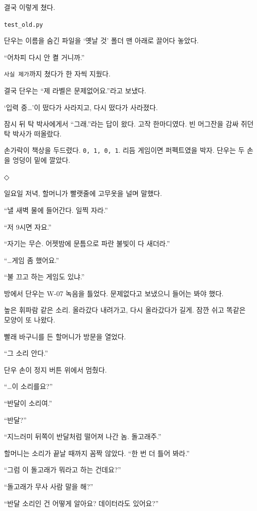 \documentclass[
  korean,
  letterpaper,
  twoside,
  open=any,
  fontsize=12.5pt,
  headings=small]{scrbook}
\begin{document}
결국 이렇게 쳤다.

\mbox{\texttt{test\_old.py}}

단우는 이름을 숨긴 파일을
`옛날 것' 폴더 맨 아래로
끌어다 놓았다.

``어차피 다시 안 켤 거니까.''

\texttt{사실\ 제가}까지 쳤다가
한 자씩 지웠다.

결국 단우는 ``제 라벨은
문제없어요.''라고 보냈다.

`입력 중\ldots'이 떴다가
사라지고, 다시 떴다가
사라졌다.

잠시 뒤 탁 박사에게서
``그래.''라는 답이 왔다. 고작
한마디였다. 빈 머그잔을 감싸
쥐던 탁 박사가 떠올랐다.

손가락이 책상을 두드렸다.
\mbox{\texttt{0, 1, 0, 1}}.
리듬 게임이면 퍼펙트였을 박자.
단우는 두 손을 엉덩이 밑에
깔았다.

\begin{center}◇\end{center}\nopagebreak

일요일 저녁, 할머니가 빨랫줄에
고무옷을 널며 말했다.

``낼 새벽 물에 들어간다. 일찍
자라.''

``저 9시면 자요.''

``자기는 무슨. 어젯밤에
문틈으로 파란 불빛이 다
새더라.''

``\ldots 게임 좀 했어요.''

``불 끄고 하는 게임도 있냐.''

방에서 단우는 W-07 녹음을
틀었다. 문제없다고 보냈으니
들어는 봐야 했다.

높은 휘파람 같은 소리.
올라갔다 내려가고, 다시
올라갔다가 길게. 잠깐 쉬고
똑같은 모양이 또 나왔다.

빨래 바구니를 든 할머니가
방문을 열었다.

``그 소리 안다.''

단우 손이 정지 버튼 위에서
멈췄다.

``\ldots 이 소리를요?''

``반달이 소리여.''

``반달?''

``지느러미 뒤쪽이 반달처럼
떨어져 나간 놈. 돌고래주.''

할머니는 소리가 끝날 때까지
꼼짝 않았다. ``한 번 더 틀어
봐라.''

``그럼 이 돌고래가 뭐라고 하는
건데요?''

``돌고래가 무사 사람 말을
해?''

``반달 소리인 건 어떻게
알아요? 데이터라도 있어요?''
\end{document}
